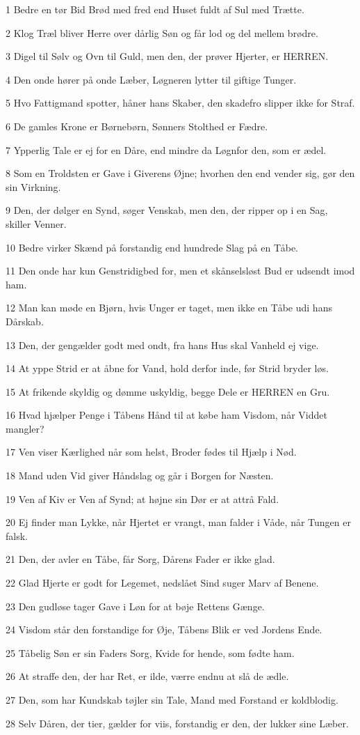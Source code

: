 \par 1 Bedre en tør Bid Brød med fred end Huset fuldt af Sul med Trætte.
\par 2 Klog Træl bliver Herre over dårlig Søn og får lod og del mellem brødre.
\par 3 Digel til Sølv og Ovn til Guld, men den, der prøver Hjerter, er HERREN.
\par 4 Den onde hører på onde Læber, Løgneren lytter til giftige Tunger.
\par 5 Hvo Fattigmand spotter, håner hans Skaber, den skadefro slipper ikke for Straf.
\par 6 De gamles Krone er Børnebørn, Sønners Stolthed er Fædre.
\par 7 Ypperlig Tale er ej for en Dåre, end mindre da Løgnfor den, som er ædel.
\par 8 Som en Troldsten er Gave i Giverens Øjne; hvorhen den end vender sig, gør den sin Virkning.
\par 9 Den, der dølger en Synd, søger Venskab, men den, der ripper op i en Sag, skiller Venner.
\par 10 Bedre virker Skænd på forstandig end hundrede Slag på en Tåbe.
\par 11 Den onde har kun Genstridigbed for, men et skånselsløst Bud er udsendt imod ham.
\par 12 Man kan møde en Bjørn, hvis Unger er taget, men ikke en Tåbe udi hans Dårskab.
\par 13 Den, der gengælder godt med ondt, fra hans Hus skal Vanheld ej vige.
\par 14 At yppe Strid er at åbne for Vand, hold derfor inde, før Strid bryder løs.
\par 15 At frikende skyldig og dømme uskyldig, begge Dele er HERREN en Gru.
\par 16 Hvad hjælper Penge i Tåbens Hånd til at købe ham Visdom, når Viddet mangler?
\par 17 Ven viser Kærlighed når som helst, Broder fødes til Hjælp i Nød.
\par 18 Mand uden Vid giver Håndslag og går i Borgen for Næsten.
\par 19 Ven af Kiv er Ven af Synd; at højne sin Dør er at attrå Fald.
\par 20 Ej finder man Lykke, når Hjertet er vrangt, man falder i Våde, når Tungen er falsk.
\par 21 Den, der avler en Tåbe, får Sorg, Dårens Fader er ikke glad.
\par 22 Glad Hjerte er godt for Legemet, nedslået Sind suger Marv af Benene.
\par 23 Den gudløse tager Gave i Løn for at bøje Rettens Gænge.
\par 24 Visdom står den forstandige for Øje, Tåbens Blik er ved Jordens Ende.
\par 25 Tåbelig Søn er sin Faders Sorg, Kvide for hende, som fødte ham.
\par 26 At straffe den, der har Ret, er ilde, værre endnu at slå de ædle.
\par 27 Den, som har Kundskab tøjler sin Tale, Mand med Forstand er koldblodig.
\par 28 Selv Dåren, der tier, gælder for viis, forstandig er den, der lukker sine Læber.

